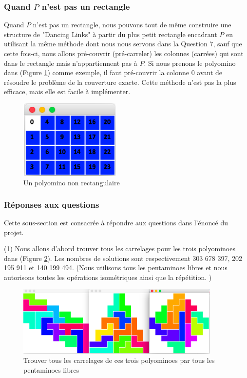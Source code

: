 \documentclass[a4paper,12pt]{article}
\begin{document}
\subsubsection{Quand $P$ n'est pas un rectangle}
Quand $P$ n'est pas un rectangle, nous pouvons tout de même construire une structure de "Dancing Links" à partir du plus petit rectangle encadrant $P$ en utilisant la même méthode dont nous nous servons dans la Question 7, sauf que cette fois-ci, nous allons pré-couvrir (pré-carreler) les colonnes (carrées) qui sont dans le rectangle mais n'appartiennent pas à $P$. Si nous prenons le polyomino dans (Figure \ref{fig:nonrectangulaire}) comme exemple, il faut pré-couvrir la colonne 0 avant de résoudre le problème de la couverture exacte. Cette méthode n'est pas la plus efficace, mais elle est facile à implémenter.
\begin{figure}
	\centering
	\includegraphics[width=0.45\textwidth]{figures/trou5}
	\caption{\label{fig:nonrectangulaire}Un polyomino non rectangulaire}
\end{figure}

\subsubsection{Réponses aux questions}
Cette sous-section est consacrée à répondre aux questions dans l'énoncé du projet.

\bigskip
\noindent (1) Nous allons d'abord trouver tous les carrelages pour les trois polyominoes dans (Figure \ref{fig:task81}). Les nombres de solutions sont respectivement 303 678 397, 202 195 911 et 140 199 494. (Nous utilisons tous les pentaminoes libres et nous autorisons toutes les opérations isométriques ainsi que la répétition. )
\begin{figure}[h]
	\centering
	\includegraphics[width=0.9\textwidth]{figures/task8_1}
	\caption{\label{fig:task81}Trouver tous les carrelages de ces trois polyominoes par tous les pentaminoes libres}
\end{figure}
\end{document}
